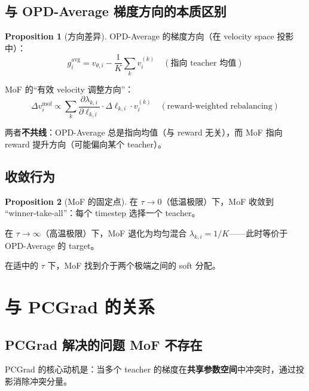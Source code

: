 \documentclass[11pt,a4paper]{article}
\theoremstyle{definition}
\newtheorem{proposition}{Proposition}
\begin{document}
\subsection{与 OPD-Average 梯度方向的本质区别}

\begin{proposition}[方向差异]
\label{prop:direction_diff}
OPD-Average 的梯度方向（在 velocity space 投影中）：
\begin{equation}
g^{\mathrm{avg}}_i = v_{\theta,i} - \frac{1}{K}\sum_k v^{(k)}_i \quad (\text{指向 teacher 均值})
\end{equation}

MoF 的``有效 velocity 调整方向''：
\begin{equation}
\Delta v_i^{\mathrm{mof}} \propto \sum_k \frac{\partial \lambda_{k,i}}{\partial \ell_{k,i}} \cdot \Delta\ell_{k,i} \cdot v^{(k)}_i \quad (\text{reward-weighted rebalancing})
\end{equation}

两者\textbf{不共线}：OPD-Average 总是指向均值（与 reward 无关），而 MoF 指向 reward 提升方向（可能偏向某个 teacher）。
\end{proposition}

\subsection{收敛行为}

\begin{proposition}[MoF 的固定点]
在 $\tau \to 0$（低温极限）下，MoF 收敛到 ``winner-take-all''：每个 timestep 选择一个 teacher。

在 $\tau \to \infty$（高温极限）下，MoF 退化为均匀混合 $\lambda_{k,i} = 1/K$——此时等价于 OPD-Average 的 target。

在适中的 $\tau$ 下，MoF 找到介于两个极端之间的 soft 分配。
\end{proposition}

\section{与 PCGrad 的关系}
\label{sec:vs_pcgrad}

\subsection{PCGrad 解决的问题 MoF 不存在}

PCGrad 的核心动机是：当多个 teacher 的梯度在\textbf{共享参数空间}中冲突时，通过投影消除冲突分量。
\end{document}
